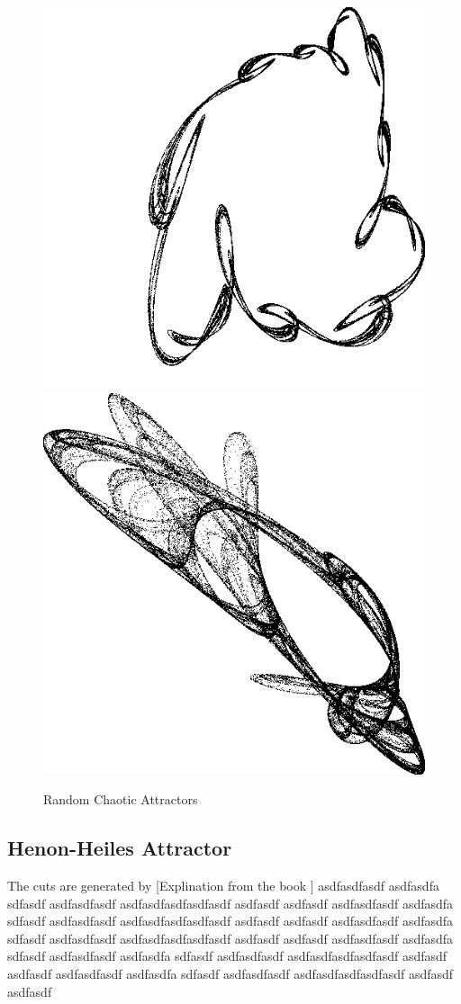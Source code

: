 \documentclass[12pt]{article}
\begin{document}
\begin{figure}[H]
    \includegraphics[width=0.47\linewidth]{Figures/random attractors/862.png}
    \includegraphics[width=0.47\linewidth]{Figures/random attractors/54966.png}
    \caption{Random Chaotic Attractors}
    \label{fig:random chaotic attractors2}
\end{figure}



\newpage

\subsection{Henon-Heiles Attractor}
The cuts are generated by [Explination from the book \cite{Numerical}] asdfasdfasdf asdfasdfa sdfasdf asdfasdfasdf asdfasdfasdfasdfasdf asdfasdf asdfasdf asdfasdfasdf asdfasdfa sdfasdf asdfasdfasdf asdfasdfasdfasdfasdf asdfasdf asdfasdf asdfasdfasdf asdfasdfa sdfasdf asdfasdfasdf asdfasdfasdfasdfasdf asdfasdf asdfasdf asdfasdfasdf asdfasdfa sdfasdf asdfasdfasdf asdfasdfa sdfasdf asdfasdfasdf asdfasdfasdfasdfasdf asdfasdf asdfasdf asdfasdfasdf asdfasdfa sdfasdf asdfasdfasdf asdfasdfasdfasdfasdf asdfasdf asdfasdf
\end{document}

